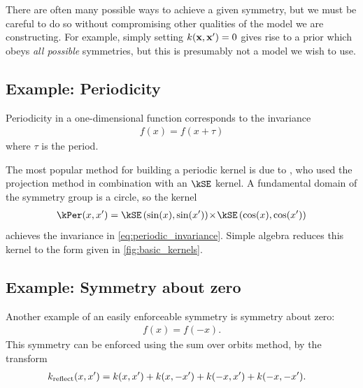 %
There are often many possible ways to achieve a given symmetry, but we must be careful to do so without compromising other qualities of the model we are constructing.
For example, simply setting $k({\bf{x}}, {\bf{x}}') = 0$ gives rise to a \gp{} prior which obeys \emph{all possible} symmetries, but this is presumably not a model we wish to use.






\subsection{Example: Periodicity}

Periodicity in a one-dimensional function corresponds to the invariance
%
\begin{align}
f(x) = f( x + \tau)
\label{eq:periodic_invariance}
\end{align}
%
where $\tau$ is the period.

The most popular method for building a periodic kernel is due to \citet{mackay1998introduction}, who used the projection method in combination with an $\kSE$ kernel.
A fundamental domain of the symmetry group is a circle, so the kernel
%
%
\begin{align}
\kPer(x, x') = \kSE \left( \sin(x), \sin(x') \right) \kerntimes \kSE \left( \cos(x), \cos(x') \right)
\end{align}
%
achieves the invariance in \cref{eq:periodic_invariance}.
Simple algebra reduces this kernel to the form given in \cref{fig:basic_kernels}.


\subsection{Example: Symmetry about zero}

Another example of an easily enforceable symmetry is symmetry about zero:
%
\begin{align}
f(x) = f( -x) .
\end{align}
%
This symmetry can be enforced using the sum over orbits method, by the transform
%
\begin{align}
k_{\textnormal{reflect}}(x, x') & = k(x, x') + k(x, -x') + k(-x, x') + k(-x, -x').
\end{align}

